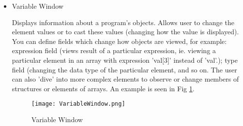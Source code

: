 \documentclass{article}
\begin{document}
\begin{itemize}
	\item Variable Window
	
	Displays information about a program's objects. Allows user to change the element values or to cast these values (changing how the value is displayed). You can define fields which change how objects are viewed, for example: expression field (views result of a particular expression, ie. viewing a particular element in an array with expression 'val[3]' instead of 'val'.); type field (changing the data type of the particular element, and so on. The user can also 'dive' into more complex elements to observe or change members of structures or elements of arrays. An example is seen in Fig \ref{fig:variable}.
	
			\begin{figure}[p] %
		\begin{center}
			\texttt{[image: VariableWindow.png]}
		\caption{Variable Window}
		\label{fig:variable}
		\end{center}
	\end{figure}
	
\end{itemize}
\end{document}
